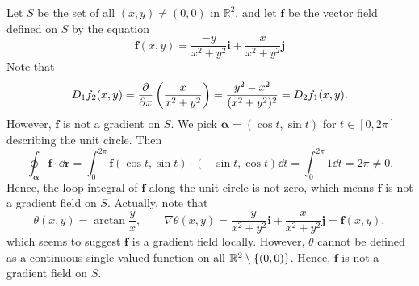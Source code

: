     \begin{exampleenv}\label{example: theta-field}
        Let $S$ be the set of all $(x,y)\ne(0,0)$ in $\mathbb R^2$, and let $\bm f$ be the vector field defined on $S$ by the equation
        \[
        \bm f(x,y)=\frac{-y}{x^2+y^2}\bm i+\frac{x}{x^2+y^2}\bm j
        \]
        Note that 
        $$ D_1 f_2(x,y) = \pdv{x}\left( \frac{x}{x^2+y^2} \right) = \frac{y^2 - x^2}{(x^2+y^2)^2} = D_2 f_1(x,y). $$
        However, $\bm f$ is not a gradient on $S$. We pick $\bm \alpha = (\cos t, \sin t)$ for $t\in [0,2\pi]$ describing the unit circle. Then
        $$ \oint_{\bm \alpha} \bm f \cdot \dd \bm r = \int_0^{2\pi} \bm f(\cos t, \sin t) \cdot (-\sin t, \cos t) \dd t = \int_0^{2\pi} 1 \dd t = 2\pi \ne 0. $$
        Hence, the loop integral of $\bm f$ along the unit circle is not zero, which means $\bm f$ is not a gradient field on $S$. Actually, note that
        $$ \theta(x,y) = \arctan \frac{y}{x},\qquad \nabla \theta(x,y) = \frac{-y}{x^2+y^2}\bm i + \frac{x}{x^2+y^2} \bm j = \bm f(x,y), $$
        which seems to suggest $\bm f$ is a gradient field locally. However, $\theta$ cannot be defined as a continuous single-valued function on all $\mathbb{R}^2 \setminus \{(0,0)\}$. Hence, $\bm f$ is not a gradient field on $S$.
    \end{exampleenv}
    
\newpage
